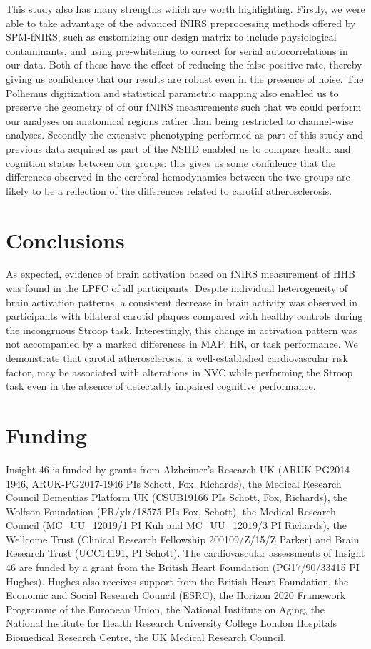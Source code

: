 \documentclass[12pt]{spieman}  %
\begin{document}
\begin{spacing}{2}
This study also has many strengths which are worth highlighting. Firstly, we were able to take advantage of the advanced fNIRS preprocessing methods offered by SPM-fNIRS, such as customizing our design matrix to include physiological contaminants, and using pre-whitening to correct for serial autocorrelations in our data. Both of these have the effect of reducing the false positive rate, thereby giving us confidence that our results are robust even in the presence of noise. The Polhemus digitization and statistical parametric mapping also enabled us to preserve the geometry of of our fNIRS measurements such that we could perform our analyses on anatomical regions rather than being restricted to channel-wise analyses. Secondly the extensive phenotyping performed as part of this study and previous data acquired as part of the NSHD enabled us to compare health and cognition status between our groups: this gives us some confidence that the differences observed in the cerebral hemodynamics between the two groups are likely to be a reflection of the differences related to carotid atherosclerosis. 


\section{Conclusions}
As expected, evidence of brain activation based on fNIRS measurement of HHB was found in the LPFC of all participants. Despite individual heterogeneity of brain activation patterns, a consistent decrease in brain activity was observed in participants with bilateral carotid plaques compared with healthy controls during the incongruous Stroop task. Interestingly, this change in activation pattern was not accompanied by a marked differences in MAP, HR, or task performance. We demonstrate that carotid atherosclerosis, a well-established cardiovascular risk factor, may be associated with alterations in NVC while performing the Stroop task even in the absence of detectably impaired cognitive performance. 

\section*{Funding}
Insight 46 is funded by grants from Alzheimer's Research UK (ARUK-PG2014-1946, ARUK-PG2017-1946 PIs Schott, Fox, Richards), the Medical Research Council Dementias Platform UK (CSUB19166 PIs Schott, Fox, Richards), the Wolfson Foundation (PR/ylr/18575 PIs Fox, Schott), the Medical Research Council (MC\_UU\_12019/1 PI Kuh and MC\_UU\_12019/3 PI Richards), the Wellcome Trust (Clinical Research Fellowship 200109/Z/15/Z Parker) and Brain Research Trust (UCC14191, PI Schott). The cardiovascular assessments of Insight 46 are funded by a grant from the British Heart Foundation (PG17/90/33415 PI Hughes). Hughes also receives support from the British Heart Foundation, the Economic and Social Research Council (ESRC), the Horizon 2020 Framework Programme of the European Union, the National Institute on Aging, the National Institute for Health Research University College London Hospitals Biomedical Research Centre, the UK Medical Research Council.  


\end{spacing}
\end{document}

